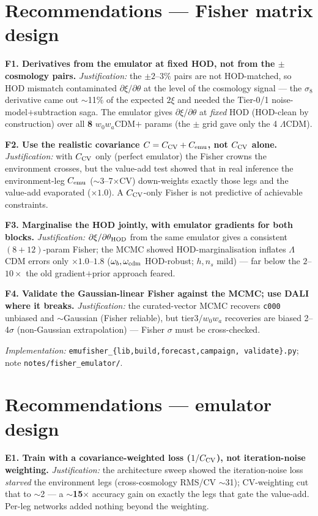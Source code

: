 \documentclass[11pt]{article}
\newcommand{\code}[1]{\texttt{#1}}
\newcommand{\Cemu}{C_{\rm emu}}
\newcommand{\Ccv}{C_{\rm CV}}
\begin{document}
\section{Recommendations --- Fisher matrix design}
\textbf{F1. Derivatives from the emulator at fixed HOD, not from the $\pm$ cosmology
pairs.} \emph{Justification:} the $\pm2$--$3\%$ pairs are not HOD-matched, so HOD
mismatch contaminated $\partial\xi/\partial\theta$ at the level of the cosmology signal
--- the $\sigma_8$ derivative came out $\sim$11\% of the expected $2\xi$ and needed the
Tier-0/1 noise-model$+$subtraction saga. The emulator gives $\partial\xi/\partial\theta$
at \emph{fixed} HOD (HOD-clean by construction) over all \textbf{8} $w_0w_a$CDM$+$ params
(the $\pm$ grid gave only the 4 $\Lambda$CDM).

\textbf{F2. Use the realistic covariance $C=\Ccv+\Cemu$, not $\Ccv$ alone.}
\emph{Justification:} with $\Ccv$ only (perfect emulator) the Fisher crowns the
environment crosses, but the value-add test showed that in real inference the
environment-leg $\Cemu$ ($\sim$3--7$\times$CV) down-weights exactly those legs and the
value-add evaporated ($\times1.0$). A $\Ccv$-only Fisher is not predictive of achievable
constraints.

\textbf{F3. Marginalise the HOD jointly, with emulator gradients for both blocks.}
\emph{Justification:} $\partial\xi/\partial\theta_{\rm HOD}$ from the same emulator gives
a consistent $(8{+}12)$-param Fisher; the MCMC showed HOD-marginalisation inflates
$\Lambda$CDM errors only $\times1.0$--$1.8$ ($\omega_b,\omega_{\rm cdm}$ HOD-robust;
$h,n_s$ mild) --- far below the $2$--$10\times$ the old gradient$+$prior approach feared.

\textbf{F4. Validate the Gaussian-linear Fisher against the MCMC; use DALI where it
breaks.} \emph{Justification:} the curated-vector MCMC recovers \code{c000} unbiased and
$\sim$Gaussian (Fisher reliable), but tier3$/w_0w_a$ recoveries are biased 2--4$\sigma$
(non-Gaussian extrapolation) --- Fisher $\sigma$ must be cross-checked.

\medskip\noindent\emph{Implementation:} \code{emufisher\_\{lib,build,forecast,campaign,
validate\}.py}; note \code{notes/fisher\_emulator/}.

\section{Recommendations --- emulator design}
\textbf{E1. Train with a covariance-weighted loss ($1/\Ccv$), not iteration-noise
weighting.} \emph{Justification:} the architecture sweep showed the iteration-noise loss
\emph{starved} the environment legs (cross-cosmology RMS/CV $\sim$31); CV-weighting cut
that to $\sim$2 --- a $\sim$\textbf{15$\times$} accuracy gain on exactly the legs that
gate the value-add. Per-leg networks added nothing beyond the weighting.
\end{document}
